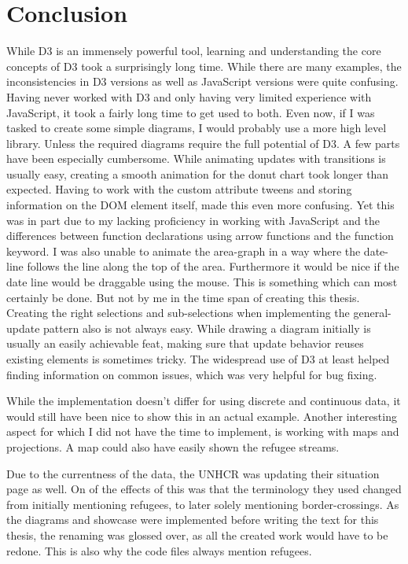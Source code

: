 \chapter{Conclusion}

While D3 is an immensely powerful tool, learning and understanding the core concepts of D3 took a surprisingly long time. While there are many examples, the inconsistencies in D3 versions as well as JavaScript versions were quite confusing. Having never worked with D3 and only having very limited experience with JavaScript, it took a fairly long time to get used to both.
Even now, if I was tasked to create some simple diagrams, I would probably use a more high level library. Unless the required diagrams require the full potential of D3.
A few parts have been especially cumbersome. While animating updates with transitions is usually easy, creating a smooth animation for the donut chart took longer than expected. Having to work with the custom attribute tweens and storing information on the DOM element itself, made this even more confusing. Yet this was in part due to my lacking proficiency in working with JavaScript and the differences between function declarations using arrow functions and the function keyword. I was also unable to animate the area-graph in a way where the date-line follows the line along the top of the area. Furthermore it would be nice if the date line would be draggable using the mouse. This is something which can most certainly be done. But not by me in the time span of creating this thesis. Creating the right selections and sub-selections when implementing the general-update pattern also is not always easy. While drawing a diagram initially is usually an easily achievable feat, making sure that update behavior reuses existing elements is sometimes tricky. The widespread use of D3 at least helped finding information on common issues, which was very helpful for bug fixing.

While the implementation doesn't differ for using discrete and continuous data, it would still have been nice to show this in an actual example. Another interesting aspect for which I did not have the time to implement, is working with maps and projections. A map could also have easily shown the refugee streams.

Due to the currentness of the data, the UNHCR was updating their situation page as well. On of the effects of this was that the terminology they used changed from initially mentioning refugees, to later solely mentioning border-crossings. As the diagrams and showcase were implemented before writing the text for this thesis, the renaming was glossed over, as all the created work would have to be redone. This is also why the code files always mention refugees. 
